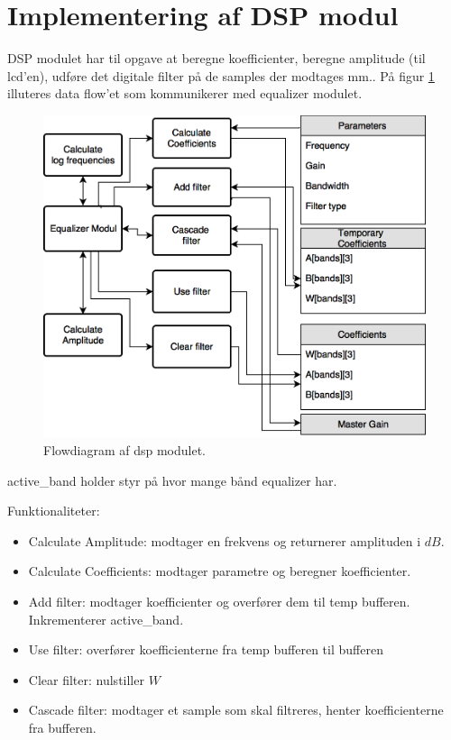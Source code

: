 \section{Implementering af DSP modul}\label{sec:implementering_dsp}
DSP modulet har til opgave at beregne koefficienter, beregne amplitude (til lcd'en), udføre det 
digitale filter på de samples der modtages mm.. På figur \ref{fig:dsp_flow_diag} illuteres data flow'et 
som kommunikerer med equalizer modulet.

\begin{figure}[h]
\centering
\includegraphics[scale = 0.3]{billeder/dsp_flowdiagram}
\caption{Flowdiagram af dsp modulet.}
\label{fig:dsp_flow_diag}
\end{figure}


active\_band holder styr på hvor mange bånd equalizer har.


Funktionaliteter:
\begin{itemize}[noitemsep,nolistsep]
\item Calculate Amplitude: modtager en frekvens og returnerer amplituden i $dB$.  \\
\item Calculate Coefficients: modtager parametre og beregner koefficienter. \\
\item Add filter: modtager koefficienter og overfører dem til temp bufferen. Inkrementerer active\_band.\\
\item Use filter: overfører koefficienterne fra temp bufferen til bufferen \\
\item Clear filter: nulstiller $W$  \\
\item Cascade filter: modtager et sample som skal filtreres, henter koefficienterne fra bufferen.
\end{itemize}